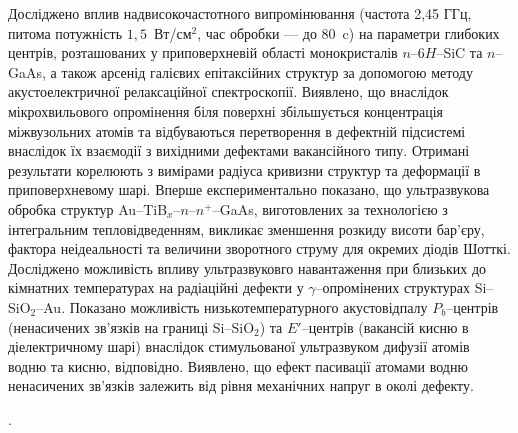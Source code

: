  Досліджено вплив надвисокочастотного випромінювання (частота 2,45 ГГц, питома потужність  $1,5$~Вт/см$^2$, час обробки --- до 80~c) на параметри глибоких центрів, розташованих у приповерхневій області монокристалів $n$--6$H$--SiC та $n$--GaAs, а також арсенід галієвих епітаксійних структур за допомогою методу акустоелектричної релаксаційної спектроскопії.
Виявлено, що внаслідок мікрохвильового опромінення біля поверхні збільшується концентрація міжвузольних атомів та відбуваються перетворення в дефектній підсистемі внаслідок їх взаємодії з вихідними дефектами вакансійного типу.
Отримані результати корелюють з вимірами радіуса кривизни структур та деформації в приповерхневому шарі.
Вперше експериментально показано, що ультразвукова обробка структур
Au--TiB$_x$--$n$--$n^+$--GaAs, виготовлених
за технологією з інтегральним тепловідведенням, викликає зменшення розкиду висоти бар'єру, фактора неідеальності та величини зворотного струму для окремих діодів Шотткі.
Досліджено можливість впливу ультразвуковго навантаження при близьких до кімнатних температурах на радіаційні дефекти у $\gamma$--опромінених структурах Si--SiO$_2$--Au.
Показано можливість низькотемпературного акустовідпалу $P_b$--центрів (ненасичених зв'язків на границі Si--SiO$_2$)
та $E'$--центрів (вакансій кисню в діелектричному шарі) внаслідок стимульованої ультразвуком дифузії атомів водню та кисню, відповідно.
Виявлено, що ефект  пасивації атомами водню ненасичених зв'язків залежить
від рівня механічних напруг в околі дефекту.

\vspace{0.7cm}
\noindent
\keywordsEn.

\vspace{2cm}



